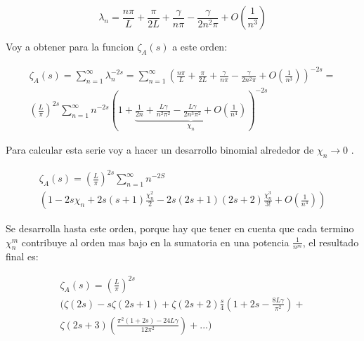 \begin{equation}
    \lambda _n = 
	\frac{n \pi}{L} + 
    \frac{\pi}{2 L} +
    \frac{\gamma}{n \pi} -
    \frac{\gamma}{2 n ^2 \pi} +
    O \left(  \frac{1}{n^3} \right) 
\end{equation}
    
Voy a obtener para la funcion $ \zeta _A (s)$ a este orden:
    
\begin{equation}
\begin{array}{cc}
    \zeta _{A} (s) =  \sum _{n=1} ^{\infty} \lambda _n ^ {-2 s} =
    \sum _{n=1} ^{\infty} 
    \left(
	\frac{n \pi}{L} + 
    \frac{\pi}{2 L} +
    \frac{\gamma}{n \pi} -
    \frac{\gamma}{2 n ^2 \pi} +
    O \left(  \frac{1}{n^3} \right) 
    \right) ^{-2 s} = \\
    ( \frac{L}{\pi} ) ^{2s}    
    \sum _{n=1} ^{\infty} 
    n ^{- 2 s} 
    \left(
    1 +     
    \underbrace{
        \frac{1}{2 n} + 
        \frac{L \gamma}{n^2 \pi ^2} -
        \frac{L \gamma}{2 n ^3 \pi ^2} +
        O(\frac{1}{n ^{4}} ) } _{ \chi _n}
    \right ) ^{-2 s}
\end{array}
\end{equation}

Para calcular esta serie voy a hacer un desarrollo binomial alrededor de $\chi _n \rightarrow{0} $  .

\begin{equation}
\begin{array}{c}
\zeta _{A} (s) = 
( \frac{L}{\pi} ) ^{2s}
\sum _{n=1} ^{\infty}
  n  ^{-2 S} \\
(
1 - 2 s \chi _n + 2 s(s+1) \frac{\chi _n ^2}{2} - 2s(2s+1)(2s+2) \frac{ \chi _n ^3}{3!}  + O( \frac{1}{n ^4}) )

\end{array}
\end{equation}

Se desarrolla hasta este orden, porque hay que tener en cuenta que cada termino $\chi _{n} ^{m} $ contribuye al orden mas bajo en la sumatoria en una potencia $\frac{1}{n ^m}$, el resultado final es:





\begin{equation}
\begin{array}{c}
    \zeta _A (s) = \left( \frac{L}{\pi} \right) ^{2s} \\
	\Bigg(
		\zeta ( 2 s ) -
		s \zeta ( 2s+1 ) +
		 \zeta (2s +2 ) \frac{s}{4} \left( 1+ 2s - \frac{8 L \gamma}{\pi ^2 } \right) + \\
		 \zeta (2s+3) \left(  
							\frac{ \pi ^2 (1+2s) - 24 L \gamma}{12 \pi ^2}
		 					\right) 
		+ ...
		\Bigg)
\end{array}
\end{equation}


